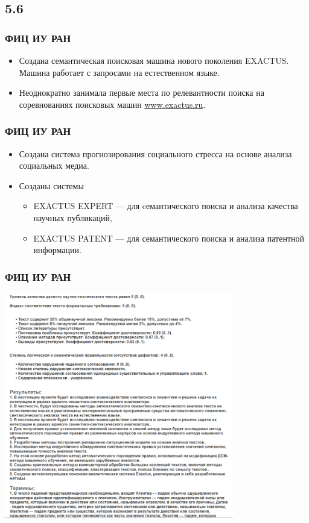 \documentclass[default]{beamer}
\begin{document}
	\subsection{5.6}
	\begin{frame}
		\frametitle{ФИЦ ИУ РАН}
		\Large
		\begin{itemize}
			\item Создана семантическая поисковая машина нового поколения EXACTUS.  Машина работает с запросами на естественном языке.
			\item Неоднократно занимала первые места по релевантности поиска на соревнованиях поисковых 	машин \href{www.exactus.ru}{www.exactus.ru}.
		\end{itemize}
	\end{frame}
	
	\begin{frame}
		\frametitle{ФИЦ ИУ РАН}
		\Large
		\begin{itemize}
			\item Создана система прогнозирования социального стресса на основе анализа социальных медиа.
			\item Созданы системы
			\begin{itemize}
				\item EXACTUS EXPERT --- для cемантического поиска и анализа качества научных публикаций,
				\item EXACTUS PATENT --- для семантического поиска и анализа патентной информации.
			\end{itemize}
		\end{itemize}
	\end{frame}

	
	\begin{frame}
		\frametitle{ФИЦ ИУ РАН}
		\centering
		
		\includegraphics[width=0.75\textwidth]{misc/exactus/analytics.png}
	\end{frame}
	
\end{document}
